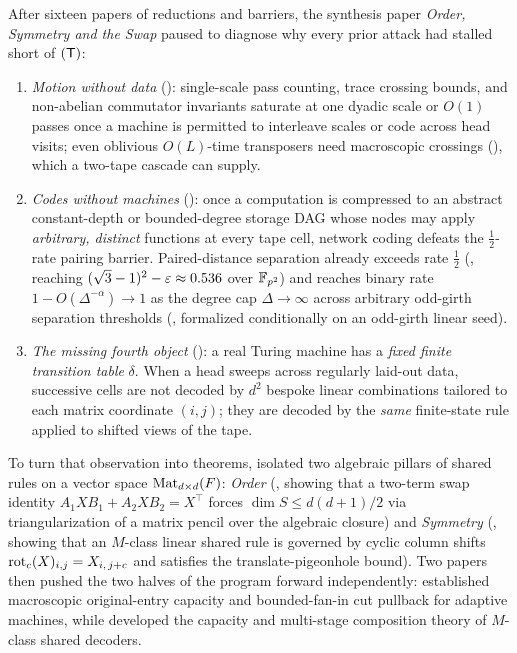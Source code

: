 After sixteen papers of reductions and barriers, the synthesis paper
\emph{Order, Symmetry and the Swap} \cite[Section~4]{SeventeenthPaper2026} paused to diagnose why
every prior attack had stalled short of $(\mathsf{T})$:
\begin{enumerate}[label=(\roman*)]
\item \emph{Motion without data} (\cite[Sections~4.2 and~4.3]{SeventeenthPaper2026}): single-scale
  pass counting, trace crossing bounds, and non-abelian commutator invariants saturate at one
  dyadic scale or $O(1)$ passes once a machine is permitted to interleave scales or code across
  head visits; even oblivious $O(L)$-time transposers need macroscopic crossings
  (\cite[Theorem~5.5, Corollary~5.6, and Section~10.3]{SixteenthPaper2026}), which a two-tape
  cascade can supply.
\item \emph{Codes without machines} (\cite[Section~4.4]{SeventeenthPaper2026}): once a computation
  is compressed to an abstract constant-depth or bounded-degree storage DAG whose nodes may apply
  \emph{arbitrary, distinct} functions at every tape cell, network coding defeats the
  $\frac{1}{2}$-rate pairing barrier. Paired-distance separation already exceeds rate $\frac{1}{2}$
  (\cite[Theorem~7.1, Theorem~7.3, and Corollary~8.2]{StorageCodes2026}, reaching
  $(\sqrt{3}-1)^2 - \varepsilon \approx 0.536$ over $\mathbb{F}_{p^2}$) and reaches binary rate
  $1 - O(\Delta^{-\alpha}) \to 1$ as the degree cap $\Delta \to \infty$ across arbitrary odd-girth
  separation thresholds (\cite[Definition~5.1, Theorem~5.5, and Theorem~6.1]{HighRate2026},
  formalized conditionally on an odd-girth linear seed).
\item \emph{The missing fourth object} (\cite[Sections~4.1 and~4.6]{SeventeenthPaper2026}): a real
  Turing machine has a \emph{fixed finite transition table} $\delta$. When a head sweeps across
  regularly laid-out data, successive cells are not decoded by $d^2$ bespoke linear combinations
  tailored to each matrix coordinate $(i,j)$; they are decoded by the \emph{same} finite-state
  rule applied to shifted views of the tape.
\end{enumerate}

To turn that observation into theorems, \cite[Sections~5 and~6]{SeventeenthPaper2026} isolated two
algebraic pillars of shared rules on a vector space $\operatorname{Mat}_{d\times d}(F)$:
\emph{Order} (\cite[Theorem~5.1 and Corollary~5.5]{SeventeenthPaper2026}, showing that a two-term
swap identity $A_1 X B_1 + A_2 X B_2 = X^\top$ forces $\dim S \le d(d+1)/2$ via triangularization
of a matrix pencil over the algebraic closure) and \emph{Symmetry} (\cite[Definition~6.3 and
Theorem~6.4]{SeventeenthPaper2026}, showing that an $M$-class linear shared rule is governed by
cyclic column shifts $\operatorname{rot}_c(X)_{i,j} = X_{i,\,j+c}$ and satisfies the translate-pigeonhole
bound).
Two papers then pushed the two halves of the program forward independently:
\cite{AdaptiveTransfer2026} established macroscopic original-entry capacity and bounded-fan-in cut
pullback for adaptive machines, while \cite{SharedDecoders2026} developed the capacity and
multi-stage composition theory of $M$-class shared decoders.

